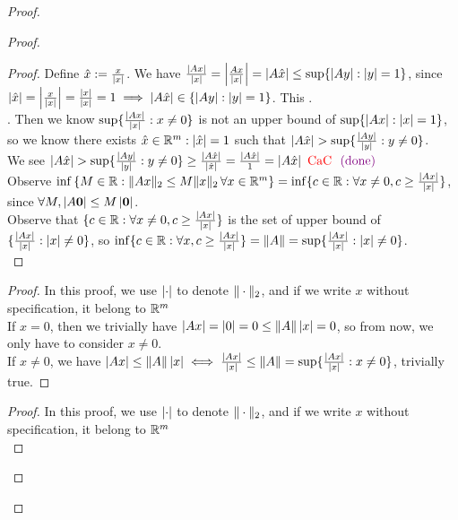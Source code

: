 \documentclass{report}
\begin{document}
\begin{proof}
\begin{proof}
\begin{proof}
Define $\hat{x}:=\frac{x}{\left|x\right|}$. We have $\frac{\left|Ax\right|}{\left|x\right|}=\left|\frac{Ax}{\left|x\right|}\right|=\left|A \hat{x}\right|\leq \sup \{ \left|Ay\right|:\left|y\right|=1 \}
$, since $\left|\hat{x}\right|=\left|\frac{x}{\left|x\right|}\right|=\frac{\left|x\right|}{\left|x\right|}=1\implies \left|A \hat{x}\right|\in \{ \left|Ay\right|:\left|y\right|=1 \}$. This \CaC.\\

. Then we know $\sup \{ \frac{\left|Ax\right|}{\left|x\right|}:x\neq 0 \}$ is not an upper bound of $\sup \{ \left|Ax\right|:\left|x\right|=1 \}$, so we know there exists $\hat{x} \in \mathbb{R}^m:\left|\hat{x}\right|=1$ such that $\abso{A \hat{x}}>\sup \set{\frac{\abso{Ay}}{\abso{y}}:y\neq 0}$.\\

We see $\abso{A \hat{x}}>\sup \set{\frac{\abso{Ay}}{\abso{y}}:y\neq 0}\geq \frac{\abso{A \hat{x}}}{\abso{\hat{x}}}=\frac{\abso{A \hat{x}}}{1}=\abso{A \hat{x}}\tCaC \vdone$\\

Observe $  \inf \left\{ M \in \mathbb{R} : \|Ax\|_2 \leq M \|x\|_2 \, \forall x \in \mathbb{R}^m \right\}= \inf \{ c \in \mathbb{R}: \forall x\neq 0, c\geq \frac{\left|Ax\right|}{\left|x\right|} \}$, since $\forall M, \left|A\textbf{0}\right|\leq M\left|\textbf{0}\right|$.\\

Observe that $   \{ c \in \mathbb{R}: \forall x\neq 0, c\geq \frac{\left|Ax\right|}{\left|x\right|} \}$ is the set of upper bound of $\{ \frac{\left|Ax\right|}{\left|x\right|}:\left|x\right|\neq 0 \}$, so $\inf   \{ c \in \mathbb{R}: \forall x, c\geq \frac{\left|Ax\right|}{\left|x\right|} \}=\| A \|=\sup \{ \frac{\left|Ax\right|}{\left|x\right|}:\left|x\right|\neq 0 \}$.\\
\end{proof}
\begin{proof}
In this proof, we use $\left|\cdot\right|$ to denote $\| \cdot \|_2$, and if we write $x$ without specification, it belong to  $\mathbb{R}^m$\\

If $x=0$, then we trivially have  $\left|Ax\right|=\left|0\right|=0\leq \| A \|\left|x\right|=0$, so from now, we only have to consider $x\neq 0$.\\

If $x\neq 0$, we have $\left|Ax\right|\leq \| A \|\left|x\right|\iff \frac{\left|Ax\right|}{\left|x\right|}\leq \| A \|=\sup \{ \frac{\left|Ax\right|}{\left|x\right|}:x\neq 0 \}$, trivially true.
\end{proof}
\begin{proof}
In this proof, we use $\left|\cdot\right|$ to denote $\| \cdot \|_2$, and if we write $x$ without specification, it belong to  $\mathbb{R}^m$\\


\end{proof}
\end{proof}
\end{proof}
\end{document}
